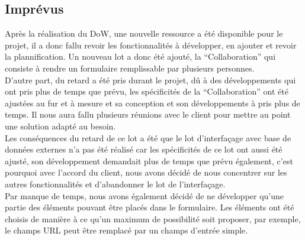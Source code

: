 \documentclass{sigplanconf}
\begin{document}
\subsection{Imprévus}
Après la réalisation du DoW, une nouvelle ressource a été disponible pour le projet, il a donc fallu revoir les fonctionnalités à développer, en ajouter et revoir la plannification. Un nouveau lot a donc été ajouté, la ``Collaboration'' qui consiste à rendre un formulaire remplissable par plusieurs personnes.\\
D'autre part, du retard a été pris durant le projet, dû à des développements qui ont pris plus de temps que prévu, les spécificités de la ``Collaboration'' ont été ajustées au fur et à mesure et sa conception et son développements à pris plus de temps. Il nous aura fallu plusieurs réunions avec le client pour mettre au point une solution adapté au besoin.\\
Les conséquences du retard de ce lot a été que le lot d'interfaçage avec base de données externes n'a pas été réalisé car les spécificités de ce lot ont aussi été ajusté, son développement demandait plus de temps que prévu également, c'est pourquoi avec l'accord du client, nous avons décidé de nous concentrer sur les autres fonctionnalités et d'abandonner le lot de l'interfaçage.\\
Par manque de temps, nous avons également décidé de ne développer qu'une partie des éléments pouvant être placés dans le formulaire. Les éléments ont été choisis de manière à ce qu'un maximum de possibilité soit proposer, par exemple, le champs URL peut être remplacé par un champs d'entrée simple.
\end{document}
